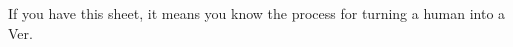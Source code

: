 \documentclass[green]{guildcamp4}
\begin{document}
\name{\gTurning{}}

If you have this sheet, it means you know the process for turning a human into a Ver.
\end{document}
